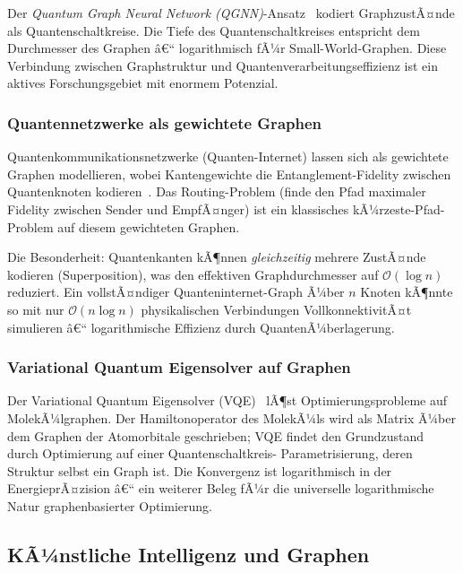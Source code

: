 ﻿\documentclass[12pt,a4paper,twoside]{article}
\theoremstyle{definition}
\theoremstyle{plain}
\theoremstyle{remark}
\begin{document}
Der \emph{Quantum Graph Neural Network (QGNN)}-Ansatz~\cite{Verdon2019}
kodiert GraphzustÃ¤nde als Quantenschaltkreise.  Die
Tiefe des Quantenschaltkreises entspricht dem Durchmesser
des Graphen â€“ logarithmisch fÃ¼r Small-World-Graphen.
Diese Verbindung zwischen Graphstruktur und Quantenverarbeitungseffizienz
ist ein aktives Forschungsgebiet mit enormem Potenzial.

\subsubsection{Quantennetzwerke als gewichtete Graphen}

Quantenkommunikationsnetzwerke (Quanten-Internet) lassen sich
als gewichtete Graphen modellieren, wobei Kantengewichte die
Entanglement-Fidelity zwischen Quantenknoten kodieren~\cite{Kimble2008}.
Das Routing-Problem (finde den Pfad maximaler Fidelity zwischen
Sender und EmpfÃ¤nger) ist ein klassisches kÃ¼rzeste-Pfad-Problem
auf diesem gewichteten Graphen.

Die Besonderheit: Quantenkanten kÃ¶nnen \emph{gleichzeitig}
mehrere ZustÃ¤nde kodieren (Superposition), was den effektiven
Graphdurchmesser auf $\mathcal{O}(\log n)$ reduziert.
Ein vollstÃ¤ndiger Quanteninternet-Graph Ã¼ber $n$ Knoten kÃ¶nnte
so mit nur $\mathcal{O}(n \log n)$ physikalischen Verbindungen
VollkonnektivitÃ¤t simulieren â€“ logarithmische Effizienz durch
QuantenÃ¼berlagerung.

\subsubsection{Variational Quantum Eigensolver auf Graphen}

Der Variational Quantum Eigensolver (VQE)~\cite{Peruzzo2014}
lÃ¶st Optimierungsprobleme auf MolekÃ¼lgraphen.  Der
Hamiltonoperator des MolekÃ¼ls wird als Matrix Ã¼ber dem
Graphen der Atomorbitale geschrieben; VQE findet den
Grundzustand durch Optimierung auf einer Quantenschaltkreis-
Parametrisierung, deren Struktur selbst ein Graph ist.
Die Konvergenz ist logarithmisch in der EnergieprÃ¤zision â€“
ein weiterer Beleg fÃ¼r die universelle logarithmische Natur
graphenbasierter Optimierung.

\subsection{KÃ¼nstliche Intelligenz und Graphen}
\label{sub:ki}
\end{document}
